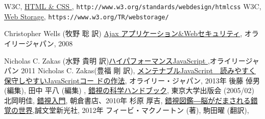 \begin{thebibliography}{99}
 W3C,
				 \href{http://www.w3.org/standards/webdesign/htmlcss}
				 {HTML \& CSS
         }, \texttt{http://www.w3.org/standards/webdesign/htmlcss}
 W3C, \href{https://www.w3.org/TR/webstorage/}
				 {Web Storage}, \texttt{https://www.w3.org/TR/webstorage/}
\iffalse\else
 Christopher Wells (牧野 聡  訳)
\href{http://www.amazon.co.jp/Ajaxアプリケーション-Webセキュリティ-Christopher-Wells/dp/487311358X/ref=sr_1_2?ie=UTF8&s=books&qid=1208068747&sr=8-2}
	 {Ajax アプリケーション\&Webセキュリティ}, オライリージャパン, 2008
\fi
 Nicholas C. Zakas (水野 貴明 訳)\href{http://www.amazon.co.jp/%E3%83%8F%E3%82%A4%E3%83%91%E3%83%95%E3%82%A9%E3%83%BC%E3%83%9E%E3%83%B3%E3%82%B9JavaScript-Nicholas-C-Zakas/dp/487311490X/ref=sr_1_1?ie=UTF8&s=books&qid=1304649839&sr=8-1}{ハイパフォーマンスJavaScript },オライリージャパン 2011
Nicholas C. Zakas(豊福 剛 訳), 
\href{http://www.amazon.co.jp/%E3%83%A1%E3%83%B3%E3%83%86%E3%83%8A%E3%83%96%E3%83%ABJavaScript-%E2%80%95%E8%AA%AD%E3%81%BF%E3%82%84%E3%81%99%E3%81%8F%E4%BF%9D%E5%AE%88%E3%81%97%E3%82%84%E3%81%99%E3%81%84JavaScript%E3%82%B3%E3%83%BC%E3%83%89%E3%81%AE%E3%81%9F%E3%82%81%E3%81%AE%E4%BD%9C%E6%B3%95-Nicholas-C-Zakas/dp/4873116104/ref=sr_1_1?ie=UTF8&qid=1365330242&sr=8-1&keywords=%E3%83%A1%E3%83%B3%E3%83%86%E3%83%8A%E3%83%96%E3%83%ABJavaScript%E3%80%80}
{メンテナブルJavaScript　読みやすく保守しやすいJavaScriptコー
ドの作法}, オライリー・ジャパン, 2013年
後藤 倬男 (編集), 田中 平八 (編集) , \href{http://www.amazon.co.jp/%E9%8C%AF%E8%A6%96%E3%81%AE%E7%A7%91%E5%AD%A6%E3%83%8F%E3%83%B3%E3%83%89%E3%83%96%E3%83%83%E3%82%AF-%E5%BE%8C%E8%97%A4-%E5%80%AC%E7%94%B7/dp/4130111159/sr=1-3/qid=1167376185/ref=sr_1_3/503-0729601-8062303?ie=UTF8&s=books}
{錯視の科学ハンドブック}, 東京大学出版会 (2005/02)
北岡明佳, 
				\href{http://www.amazon.co.jp/%E9%8C%AF%E8%A6%96%E5%85%A5%E9%96%80-%E5%8C%97%E5%B2%A1-%E6%98%8E%E4%BD%B3/dp/4254102267/ref=sr_1_2?s=books&ie=UTF8&qid=1457334952&sr=1-2&keywords=%E5%8C%97%E5%B2%A1%E6%98%8E%E4%BD%B3}
				{錯視入門}, 朝倉書店、2010年
        \iffalse
 杉原 厚吉,
				\href{http://www.amazon.co.jp/%E9%8C%AF%E8%A6%96%E5%9B%B3%E9%91%91%E2%80%95%E8%84%B3%E3%81%8C%E3%81%A0%E3%81%BE%E3%81%95%E3%82%8C%E3%82%8B%E9%8C%AF%E8%A6%9A%E3%81%AE%E4%B8%96%E7%95%8C-%E6%9D%89%E5%8E%9F-%E5%8E%9A%E5%90%89/dp/4416212658/ref=sr_1_4?s=books&ie=UTF8&qid=1457335216&sr=1-4&keywords=%E9%8C%AF%E8%A6%96}{錯視図鑑―脳がだまされる錯覚の世界},誠文堂新光社, 2012年
 フィービ・マクノートン (著), 駒田曜 (翻訳),

\end{thebibliography}
